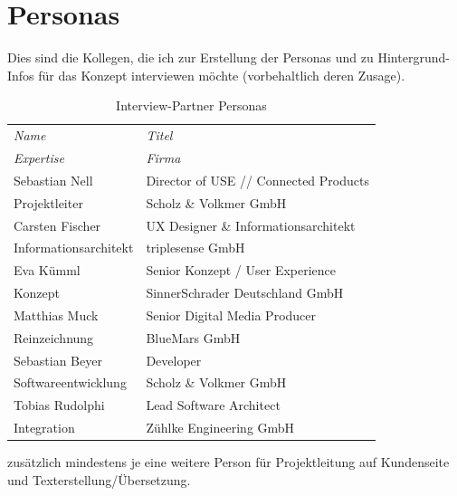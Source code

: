 \documentclass[11pt,a4paper]{article}
\begin{document}
\section{Personas}

Dies sind die Kollegen, die ich zur Erstellung der Personas und zu Hintergrund-Infos für das Konzept interviewen möchte (vorbehaltlich deren Zusage).

\begin{table}[htb]
\begin{tabular}{l l}

\textit{Name} & \textit{Titel} \\
\textit{Expertise} & \textit{Firma} \\

\hline

Sebastian Nell & Director of USE // Connected Products  \\
Projektleiter & Scholz \& Volkmer GmbH \\

\hline

Carsten Fischer & UX Designer \& Informationsarchitekt   \\
Informationsarchitekt & triplesense GmbH \\

\hline

Eva Kümml & Senior Konzept / User Experience \\
Konzept & SinnerSchrader Deutschland GmbH \\

\hline

Matthias Muck & Senior Digital Media Producer  \\
Reinzeichnung & BlueMars GmbH  \\

\hline

Sebastian Beyer & Developer  \\
Softwareentwicklung & Scholz \& Volkmer GmbH \\

\hline

Tobias Rudolphi & Lead Software Architect  \\
Integration & Zühlke Engineering GmbH \\

\end{tabular}
\caption{Interview-Partner Personas}
\end{table}

zusätzlich mindestens je eine weitere Person für Projektleitung auf Kundenseite und Texterstellung/Übersetzung.
\end{document}
